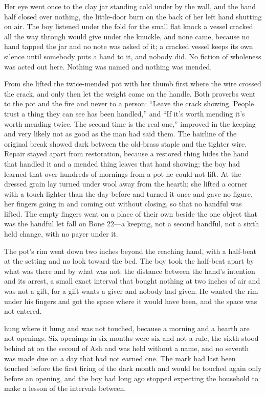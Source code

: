 Her eye went once to the clay jar standing cold under  by the wall, and the hand half closed over nothing, the little-door burn on the back of her left hand shutting on air. The boy listened under the fold for the small flat knock a vessel cracked all the way through would give under the knuckle, and none came, because no hand tapped the jar and no note was asked of it; a cracked vessel keeps its own silence until somebody puts a hand to it, and nobody did. No fiction of wholeness was acted out here. Nothing was named and nothing was mended.

From  she lifted the twice-mended pot with her thumb first where the wire crossed the crack, and only then let the weight come on the handle. Both proverbs went to the pot and the fire and never to a person: “Leave the crack showing. People trust a thing they can see has been handled,” and “If it's worth mending it's worth mending twice. The second time is the real one,” improved in the keeping and very likely not as good as the man had said them. The hairline of the original break showed dark between the old-brass staple and the tighter wire. Repair stayed apart from restoration, because a restored thing hides the hand that handled it and a mended thing leaves that hand showing; the boy had learned that over hundreds of mornings from a pot he could not lift. At  the dressed grain lay turned under wool away from the hearth; she lifted a corner with a touch lighter than the day before and turned it once and gave no figure, her fingers going in and coming out without closing, so that no handful was lifted. The empty fingers went on a place of their own beside the one object that was the handful let fall on Bone 22---a keeping, not a second handful, not a sixth held change, with no payer under it.

The pot's rim went down two inches beyond the reaching hand, with a half-beat at the setting and no look toward the bed. The boy took the half-beat apart by what was there and by what was not: the distance between the hand's intention and its arrest, a small exact interval that bought nothing at two inches of air and was not a gift, for a gift wants a giver and nobody had given. He wanted the rim under his fingers and got the space where it would have been, and the space was not entered.

\scenebreak

 hung where it hung and was not touched, because a morning and a hearth are not openings. Six openings in six months were six and not a rule, the sixth stood behind at  on the second of Ash and was held without a name, and no seventh was made due on a day that had not earned one. The mark had last been touched before the first firing of the dark month and would be touched again only before an opening, and the boy had long ago stopped expecting the household to make a lesson of the intervals between.

